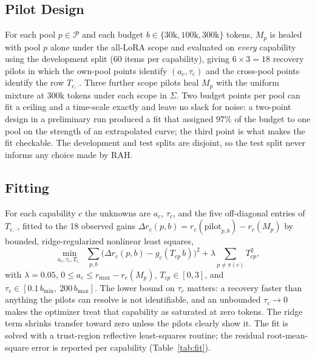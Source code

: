 \documentclass{ieeeaccess}
\newcommand{\Mp}{M_{p}}
\newcommand{\pools}{\mathcal{P}}
\newcommand{\own}{\pi}
\newcommand{\RAH}{RAH}
\begin{document}
\subsection{Pilot Design}
For each pool $p\in\pools$ and each budget $b\in\{30\mathrm{k},100\mathrm{k},300\mathrm{k}\}$ tokens, $\Mp$ is healed with pool $p$ alone under the all-LoRA scope and evaluated on \emph{every} capability using the development split (60 items per capability), giving $6\times 3 = 18$ recovery pilots in which the own-pool points identify $(a_c,\tau_c)$ and the cross-pool points identify the row $T_{c,\cdot}$. Three further scope pilots heal $\Mp$ with the uniform mixture at 300k tokens under each scope in $\Sigma$. Two budget points per pool can fit a ceiling and a time-scale exactly and leave no slack for noise: a two-point design in a preliminary run produced a fit that assigned 97\% of the budget to one pool on the strength of an extrapolated curve; the third point is what makes the fit checkable. The development and test splits are disjoint, so the test split never informs any choice made by \RAH.

\subsection{Fitting}
For each capability $c$ the unknowns are $a_c$, $\tau_c$, and the five off-diagonal entries of $T_{c,\cdot}$, fitted to the 18 observed gains $\Delta r_c(p,b) = r_c(\text{pilot}_{p,b}) - r_c(\Mp)$ by bounded, ridge-regularized nonlinear least squares,
\begin{equation}
\min_{a_c,\tau_c,T_{c,\cdot}}\ \sum_{p,b}\Big(\Delta r_c(p,b) - g_c(T_{cp}\,b)\Big)^2 + \lambda\!\!\sum_{p\ne\own(c)}\! T_{cp}^2,
\label{eq:fit}
\end{equation}
with $\lambda = 0.05$, $0 \le a_c \le r_{\max} - r_c(\Mp)$, $T_{cp}\in[0,3]$, and $\tau_c \in [0.1\,b_{\min},\ 200\,b_{\max}]$. The lower bound on $\tau_c$ matters: a recovery faster than anything the pilots can resolve is not identifiable, and an unbounded $\tau_c \to 0$ makes the optimizer treat that capability as saturated at zero tokens. The ridge term shrinks transfer toward zero unless the pilots clearly show it. The fit is solved with a trust-region reflective least-squares routine; the residual root-mean-square error is reported per capability (Table~\ref{tab:fit}).
\end{document}
